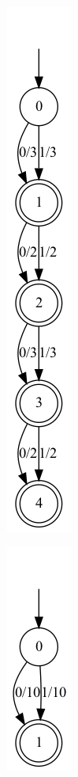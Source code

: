 \begin{figure}
    \centering
    \begin{subfigure}{.1\textwidth}
        \centering
        \includegraphics[scale=0.3]{obrazky-figures/add_inners_1_img_aut1.png}
        \caption{}
        \label{add_inners_1_img_aut1}
    \end{subfigure}
    \hfil
    \begin{subfigure}{.1\textwidth}
        \centering
        \includegraphics[scale=0.3]{obrazky-figures/add_inners_1_img_aut2.png}

\end{subfigure}
\end{figure}
